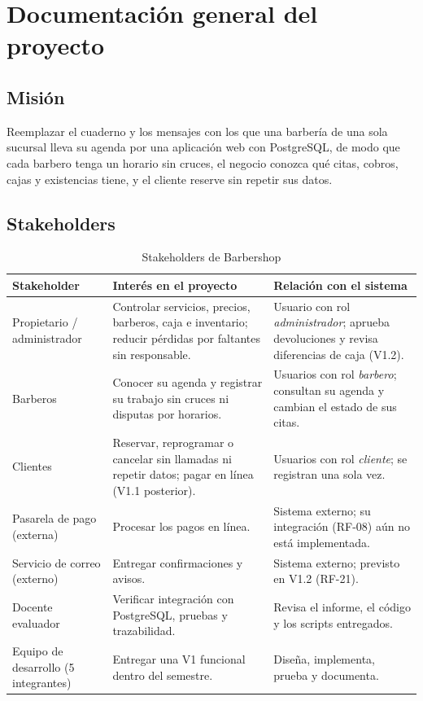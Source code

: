 \documentclass[12pt,a4paper,oneside]{article}
\begin{document}
\section{Documentaci\'on general del proyecto}
\subsection{Misi\'on}
Reemplazar el cuaderno y los mensajes con los que una barber\'ia de una sola sucursal lleva su agenda por una aplicaci\'on web con PostgreSQL, de modo que cada barbero tenga un horario sin cruces, el negocio conozca qu\'e citas, cobros, cajas y existencias tiene, y el cliente reserve sin repetir sus datos.

\subsection{Stakeholders}
\begin{table}[H]\centering\small
\begin{tabularx}{\textwidth}{>{\raggedright\arraybackslash}p{3.2cm}YY}\toprule
\textbf{Stakeholder} & \textbf{Inter\'es en el proyecto} & \textbf{Relaci\'on con el sistema}\\\midrule
Propietario / administrador & Controlar servicios, precios, barberos, caja e inventario; reducir p\'erdidas por faltantes sin responsable. & Usuario con rol \emph{administrador}; aprueba devoluciones y revisa diferencias de caja (V1.2).\\
Barberos & Conocer su agenda y registrar su trabajo sin cruces ni disputas por horarios. & Usuarios con rol \emph{barbero}; consultan su agenda y cambian el estado de sus citas.\\
Clientes & Reservar, reprogramar o cancelar sin llamadas ni repetir datos; pagar en l\'inea (V1.1 posterior). & Usuarios con rol \emph{cliente}; se registran una sola vez.\\
Pasarela de pago (externa) & Procesar los pagos en l\'inea. & Sistema externo; su integraci\'on (RF-08) a\'un no est\'a implementada.\\
Servicio de correo (externo) & Entregar confirmaciones y avisos. & Sistema externo; previsto en V1.2 (RF-21).\\
Docente evaluador & Verificar integraci\'on con PostgreSQL, pruebas y trazabilidad. & Revisa el informe, el c\'odigo y los scripts entregados.\\
Equipo de desarrollo (5 integrantes) & Entregar una V1 funcional dentro del semestre. & Dise\~na, implementa, prueba y documenta.\\\bottomrule
\end{tabularx}
\caption{Stakeholders de Barbershop}\end{table}
\end{document}
